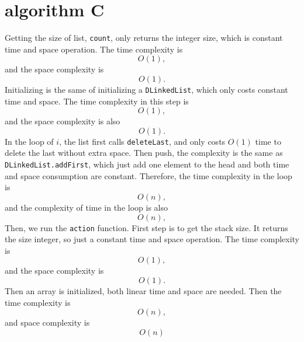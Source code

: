 \documentclass[natbib,12pt]{article}
\begin{document}
\section{algorithm C}
	Getting the size of list, {\tt count}, only returns the integer size, which is constant time and space operation. The time complexity is
	\begin{equation}
	O(1), \label{eqn:time3-1}
	\end{equation}
	and the space complexity is
	\begin{equation}
	O(1). \label{eqn:space3-1}
	\end{equation}
	Initializing is the same of initializing a {\tt DLinkedList}, which only costs constant time and space. The time complexity in this step is
	\begin{equation}
		O(1),  \label{eqn:time3-2}
	\end{equation}
	and the space complexity is also 
	\begin{equation}
		O(1). \label{eqn:space3-2}
	\end{equation}
	In the loop of $i$, the list first calls {\tt deleteLast}, and only costs $O(1)$ time to delete the last without extra space. Then push, the complexity is the same as {\tt DLinkedList.addFirst}, which just add one element to the head and both time and space consumption are constant. Therefore, the time complexity in the loop is 
	\begin{equation}
		O(n), \label{eqn:time3-3}
	\end{equation}
	and the complexity of time in the loop is also
	\begin{equation}
	O(n), \label{eqn:space3-9}
	\end{equation}
	Then, we run the {\tt action} function. First step is to get the stack size. It returns the size integer, so just a constant time and space operation. The time complexity is
	\begin{equation}
	O(1), \label{eqn:time3-4}
	\end{equation}
	and the space complexity is
	\begin{equation}
	O(1). \label{eqn:space3-3}
	\end{equation}
	Then an array is initialized, both linear time and space are needed. Then the time complexity is
	\begin{equation}
	O(n), \label{eqn:time3-5}
	\end{equation}
	and space complexity is
	\begin{equation}
	O(n) \label{eqn:space3-4}
	\end{equation}
\end{document}
